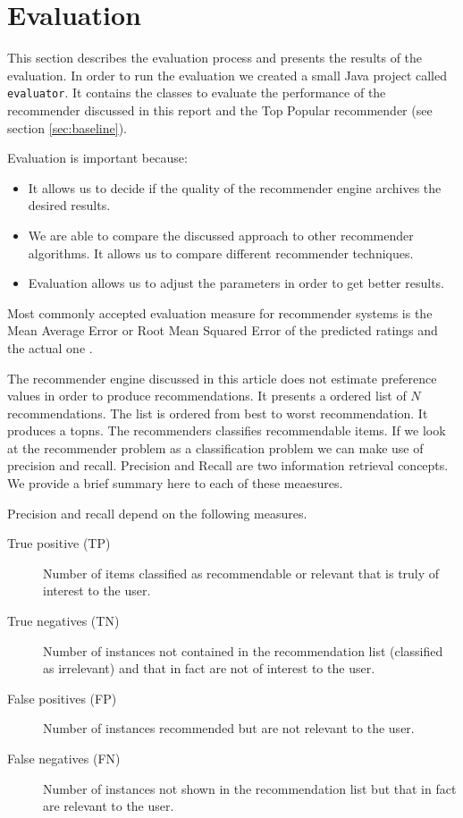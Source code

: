 \section{Evaluation}
\label{sec:evaluation}

This section describes the evaluation process and presents the results of the evaluation. In order to run the evaluation we created a small Java project called \verb|evaluator|. It contains the classes to evaluate the performance of the recommender discussed in this report and the Top Popular recommender (see section \ref{sec:baseline}).

Evaluation is important because:
\begin{itemize}
  \item It allows us to decide if the quality of the recommender engine archives the desired results. 
  \item We are able to compare the discussed approach to other recommender algorithms. It allows us to compare different recommender techniques.
  \item Evaluation allows us to adjust the parameters in order to get better results.
\end{itemize}

Most commonly accepted evaluation measure for recommender systems is the Mean Average Error or Root Mean Squared Error of the predicted ratings and the actual one \cite{Ricci}.

The recommender engine discussed in this article does not estimate preference values in order to produce recommendations. It presents a ordered list of $N$ recommendations. The list is ordered from best to worst recommendation. It produces a \glspl{topn}. The recommenders classifies recommendable items. If we look at the recommender problem as a classification problem we can make use of precision and recall. Precision and Recall are two information retrieval concepts. We provide a brief summary here to each of these meaesures.

Precision and recall depend on the following measures.
\begin{description}
\item[True positive (TP)] Number of items classified as recommendable or relevant that is truly of interest to the user.
\item[True negatives (TN)] Number of instances not contained in the recommendation list (classified as irrelevant) and that in fact are not of interest to the user.
\item[False positives (FP)] Number of instances recommended but are not relevant to the user.
\item[False negatives (FN)] Number of instances not shown in the recommendation list but that in fact are relevant to the user.
\end{description}


